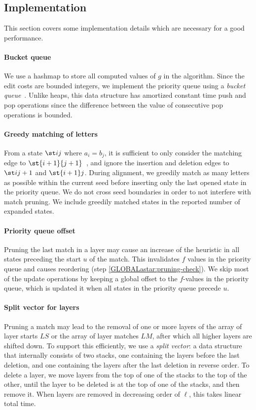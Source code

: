 \subsection{Implementation}\label{GLOBALsec:impl}

This section covers some implementation details which are necessary for a good
performance.

\paragraph{Bucket queue}
We use a hashmap to store all computed values of $g$ in the \A algorithm.
Since the edit costs are bounded integers, we implement the priority queue
using a \emph{bucket queue}~\citep{bertsekas1991linear}. Unlike
heaps, this data structure has amortized constant time push and pop operations
since the difference between the value of consecutive pop operations is bounded.

\paragraph{Greedy matching of letters}
From a state $\st ij$ where $a_i = b_j$, it is sufficient to only consider the
matching edge to $\st {i+1}{j+1}$~\citep{allison_lazy_1992}, and ignore the
insertion and deletion edges to $\st i{j+1}$ and $\st {i+1}j$. During alignment,
we greedily match as many letters as possible within the current seed before
inserting only the last opened state in the priority queue. We do not cross seed
boundaries in order to not interfere with match pruning. We include greedily
matched states in the reported number of expanded states.

\paragraph{Priority queue offset}
Pruning the last match in a layer may cause an increase of the heuristic in all
states preceding the start $u$ of the match. This invalidates $f$ values in the
priority queue and causes reordering (step \cref{GLOBALastar:pruning-check}).
We skip most of the update operations by keeping a global
offset to the $f$-values in the priority queue, which is updated it when all
states in the priority queue precede $u$.

\paragraph{Split vector for layers}
Pruning a match may lead to the removal of one or more layers of the array of
layer starts $LS$ or the array of layer matches $LM$, after which all higher
layers are shifted down. To support this efficiently, we use a \emph{split
vector}: a data structure that internally consists of two stacks, one containing
the layers before the last deletion, and one containing the layers after the
last deletion in reverse order. To delete a layer, we move layers from the top
of one of the stacks to the top of the other, until the layer to be deleted is
at the top of one of the stacks, and then remove it. When layers are removed in
decreasing order of $\ell$, this takes linear total time.

